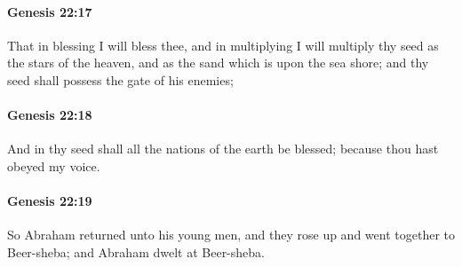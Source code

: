 		\paragraph{Genesis 22:17} %
			\label{GENESIS-22-17}

			That in blessing I will bless thee, and in multiplying I will multiply thy seed as the stars of the heaven, and as the sand which is upon the sea shore; and thy seed shall possess the gate of his enemies;


		\paragraph{Genesis 22:18} %
			\label{GENESIS-22-18}

			And in thy seed shall all the nations of the earth be blessed; because thou hast obeyed my voice.


		\paragraph{Genesis 22:19} %
			\label{GENESIS-22-19}

			So Abraham returned unto his young men, and they rose up and went together to Beer-sheba; and Abraham dwelt at Beer-sheba.



